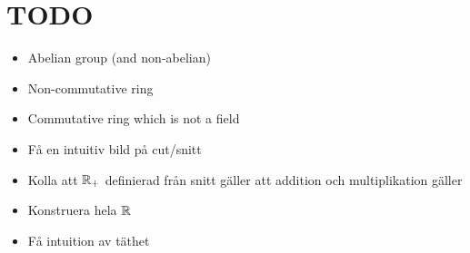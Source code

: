 \section{TODO}\par
\begin{itemize}
  \item Abelian group (and non-abelian)
  \item Non-commutative ring
  \item Commutative ring which is not a field
  \item Få en intuitiv bild på cut/snitt 
  \item Kolla att $\mathbb{R}_+$ definierad från snitt gäller att addition och multiplikation gäller
  \item Konstruera hela $\mathbb{R}$
  \item Få intuition av täthet
\end{itemize}
